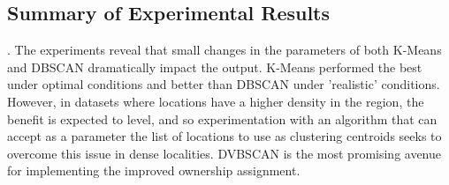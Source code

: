 \subsection{Summary of Experimental Results}. 
The experiments reveal that small changes in the parameters of both K-Means and DBSCAN dramatically impact the output. K-Means performed the best under optimal conditions and better than DBSCAN under 'realistic' conditions. 
However, in datasets where locations have a higher density in the region, the benefit is expected to level, and so experimentation with an algorithm that can accept as a parameter the list of locations to use as clustering centroids seeks to overcome this issue in dense localities. 
DVBSCAN is the most promising avenue for implementing the improved ownership assignment. 
